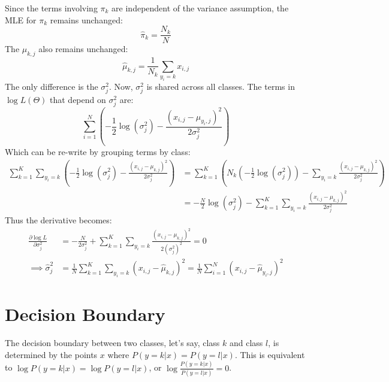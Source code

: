 \documentclass[11pt, a4paper, oneside]{memoir}
\begin{document}
Since the terms involving $\pi_k$ are independent of the variance assumption, the MLE for $\pi_k$ remains unchanged:
\[ \hat{\pi}_k = \frac{N_k}{N} \]
The $\mu_{k,j}$ also remains unchanged:
\[ \hat{\mu}_{k,j} = \frac{1}{N_k} \sum_{y_i=k} x_{i,j} \]
The only difference is the $\sigma^2_j$.
Now, $\sigma^2_j$ is shared across all classes. The terms in $\log L(\Theta)$ that depend on $\sigma^2_j$ are:
\[ \sum_{i=1}^{N} \left( -\frac{1}{2} \log(\sigma^2_{j}) - \frac{(x_{i,j} - \mu_{y_i,j})^2}{2\sigma^2_{j}} \right) \]
Which can be re-write by grouping terms by class:
\begin{align*}
    \sum_{k=1}^{K} \sum_{y_i=k} \left( -\frac{1}{2} \log(\sigma^2_{j}) - \frac{(x_{i,j} - \mu_{k,j})^2}{2\sigma^2_{j}} \right) & =
    \sum_{k=1}^{K} \left( N_k \left(-\frac{1}{2} \log(\sigma^2_{j})\right) - \sum_{y_i=k} \frac{(x_{i,j} - \mu_{k,j})^2}{2\sigma^2_{j}} \right)                                                                                                \\
                                                                                                                               & = -\frac{N}{2} \log(\sigma^2_{j}) - \sum_{k=1}^{K} \sum_{y_i=k} \frac{(x_{i,j} - \mu_{k,j})^2}{2\sigma^2_{j}}
\end{align*}
Thus the derivative becomes:
\begin{align*}
    \frac{\partial \log L}{\partial \sigma^2_j} & = -\frac{N}{2\sigma^2_j} + \sum_{k=1}^{K} \sum_{y_i=k} \frac{(x_{i,j} - \mu_{k,j})^2}{2(\sigma^2_j)^2} = 0                           \\
    \implies \hat{\sigma}^2_j                   & = \frac{1}{N} \sum_{k=1}^{K} \sum_{y_i=k} (x_{i,j} - \hat{\mu}_{k,j})^2 = \frac{1}{N} \sum_{i=1}^{N} (x_{i,j} - \hat{\mu}_{y_i,j})^2
\end{align*}

\section{Decision Boundary}
The decision boundary between two classes, let's say, class $k$ and class $l$, is determined by the points $x$ where $P(y=k|x) = P(y=l|x)$.
This is equivalent to $\log P(y=k|x) = \log P(y=l|x)$, or $\log \frac{P(y=k|x)}{P(y=l|x)} = 0$.
\end{document}

